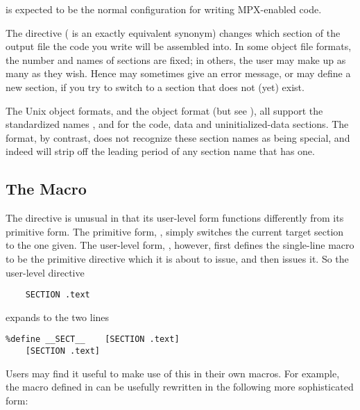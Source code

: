  is expected to be the normal configuration
for writing MPX-enabled code.


The  directive ( is an exactly equivalent
synonym) changes which section of the output file the code you write
will be assembled into. In some object file formats, the number and
names of sections are fixed; in others, the user may make up as many
as they wish. Hence  may sometimes give an error message,
or may define a new section, if you try to switch to a section that does
not (yet) exist.

The Unix object formats, and the  object format (but see
), all support the 
standardized names ,  and  for the code,
data and uninitialized-data sections. The  format, by contrast,
does not recognize these section names as being special, and indeed will
strip off the leading period of any section name that has one.

\subsection{The  Macro}
\label{subsec:sectmac}

The  directive is unusual in that its user-level form
functions differently from its primitive form. The primitive form,
, simply switches the current target section to the
one given. The user-level form, , however, first
defines the single-line macro  to be the primitive
\code{[SECTION]} directive which it is about to issue, and then issues
it. So the user-level directive

\begin{lstlisting}
    SECTION .text
\end{lstlisting}

expands to the two lines

\begin{lstlisting}
%define __SECT__    [SECTION .text]
    [SECTION .text]
\end{lstlisting}

Users may find it useful to make use of this in their own macros.
For example, the  macro defined in 
can be usefully rewritten in the following more sophisticated form:

